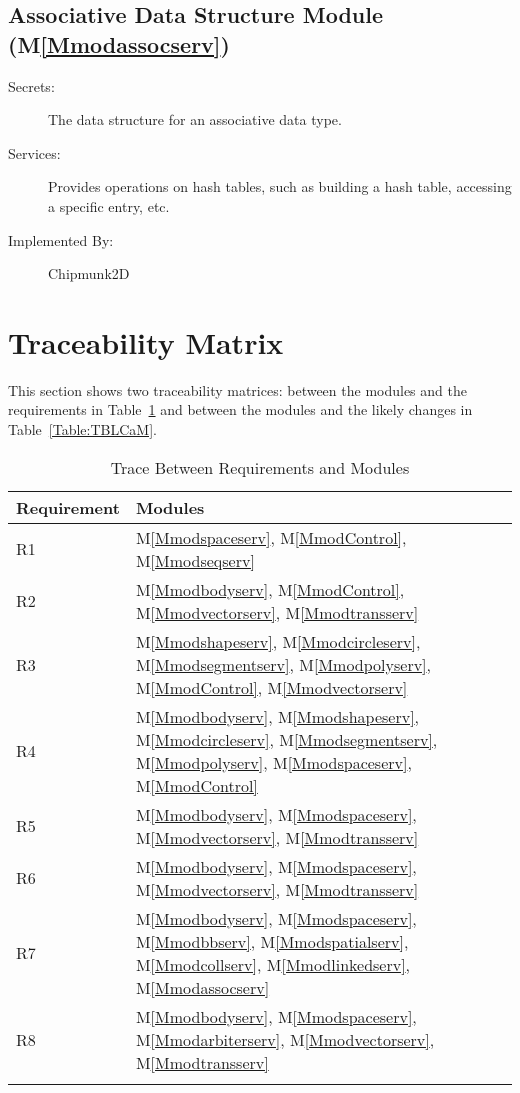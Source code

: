 \documentclass[12pt]{article}
\begin{document}
\subsection{Associative Data Structure Module (M\ref{Mmodassocserv})}
\label{Sec:ADSM()}
\begin{description}
\item[Secrets:]The data structure for an associative data type.
\item[Services:]Provides operations on hash tables, such as building a hash table, accessing a specific entry, etc.
\item[Implemented By:]Chipmunk2D
\end{description}
\section{Traceability Matrix}
\label{Sec:TM}
This section shows two traceability matrices: between the modules and the requirements in Table~\ref{Table:TBRaM} and between the modules and the likely changes in Table~\ref{Table:TBLCaM}.
\begin{longtable}{l l}
\toprule
Requirement & Modules
\\
\midrule
R1 & M\ref{Mmodspaceserv}, M\ref{MmodControl}, M\ref{Mmodseqserv}
\\
R2 & M\ref{Mmodbodyserv}, M\ref{MmodControl}, M\ref{Mmodvectorserv}, M\ref{Mmodtransserv}
\\
R3 & M\ref{Mmodshapeserv}, M\ref{Mmodcircleserv}, M\ref{Mmodsegmentserv}, M\ref{Mmodpolyserv}, M\ref{MmodControl}, M\ref{Mmodvectorserv}
\\
R4 & M\ref{Mmodbodyserv}, M\ref{Mmodshapeserv}, M\ref{Mmodcircleserv}, M\ref{Mmodsegmentserv}, M\ref{Mmodpolyserv}, M\ref{Mmodspaceserv}, M\ref{MmodControl}
\\
R5 & M\ref{Mmodbodyserv}, M\ref{Mmodspaceserv}, M\ref{Mmodvectorserv}, M\ref{Mmodtransserv}
\\
R6 & M\ref{Mmodbodyserv}, M\ref{Mmodspaceserv}, M\ref{Mmodvectorserv}, M\ref{Mmodtransserv}
\\
R7 & M\ref{Mmodbodyserv}, M\ref{Mmodspaceserv}, M\ref{Mmodbbserv}, M\ref{Mmodspatialserv}, M\ref{Mmodcollserv}, M\ref{Mmodlinkedserv}, M\ref{Mmodassocserv}
\\
R8 & M\ref{Mmodbodyserv}, M\ref{Mmodspaceserv}, M\ref{Mmodarbiterserv}, M\ref{Mmodvectorserv}, M\ref{Mmodtransserv}
\\
\bottomrule
\caption{Trace Between Requirements and Modules}
\label{Table:TBRaM}
\end{longtable}
\end{document}
